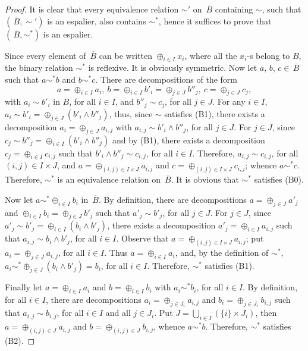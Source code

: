 \documentclass[psamsfonts,reqno]{memo-l}
\theoremstyle{plain}
\theoremstyle{definition}
\theoremstyle{remark}
\numberwithin{equation}{section}
\newcommand{\ol}[1]{\,\overline{\!#1}}
\newcommand{\set}[1]{\{#1\}}
\begin{document}
\begin{proof}
It is clear that every equivalence relation $\sim'$ on $\ol{B}$ containing
$\sim$, such that $(\ol{B},\sim')$ is an espalier, also
contains $\sim^*$, hence it suffices to prove that
$(\ol{B},\sim^*)$ is an espalier.

Since every element of $\ol{B}$ can be written $\oplus_{i\in I}x_i$, where
all the $x_i$-s belong to $B$, the binary relation $\sim^*$ is reflexive. It
is obviously symmetric. Now let $a$, $b$, $c\in\ol{B}$ such that $a\sim^*b$
and $b\sim^*c$. There are decompositions of the form
   \[
   a=\oplus_{i\in I}a_i,\ b=\oplus_{i\in I}b'_i=\oplus_{j\in J}b''_j,\
   c=\oplus_{j\in J}c_j,
   \]
with $a_i\sim b'_i$ in $B$, for all $i\in I$, and $b''_j\sim c_j$, for all
$j\in J$. For any $i\in I$, $a_i\sim b'_i=\oplus_{j\in J}(b'_i\wedge b''_j)$,
thus, since $\sim$ satisfies (B1), there exists a decomposition
$a_i=\oplus_{j\in J}a_{i,j}$ with $a_{i,j}\sim b'_i\wedge b''_j$, for all
$j\in J$. For $j\in J$, since
$c_j\sim b''_j=\oplus_{i\in I}(b'_i\wedge b''_j)$ and by (B1), there exists a
decomposition $c_j=\oplus_{i\in I}c_{i,j}$ such that
$b'_i\wedge b''_j\sim c_{i,j}$, for all $i\in I$. Therefore,
$a_{i,j}\sim c_{i,j}$, for all $(i,j)\in I\times J$, and
$a=\oplus_{(i,j)\in I\times J}a_{i,j}$ and
$c=\oplus_{(i,j)\in I\times J}c_{i,j}$; whence $a\sim^*c$. Therefore, $\sim^*$
is an equivalence relation on $\ol{B}$. It is obvious that $\sim^*$ satisfies
(B0).

Now let $a\sim^*\oplus_{i\in I}b_i$ in $\ol{B}$. By definition, there are
decompositions $a=\oplus_{j\in J}a'_j$ and
$\oplus_{i\in I}b_i=\oplus_{j\in J}b'_j$ such that $a'_j\sim b'_j$, for all
$j\in J$. For $j\in J$, since $a'_j\sim b'_j=\oplus_{i\in I}(b_i\wedge b'_j)$,
there exists a decomposition $a'_j=\oplus_{i\in I}a_{i,j}$ such that
$a_{i,j}\sim b_i\wedge b'_j$, for all $i\in I$. Observe that
$a=\oplus_{(i,j)\in I\times J}a_{i,j}$; put $a_i=\oplus_{j\in J}a_{i,j}$, for
all $i\in I$. Thus $a=\oplus_{i\in I}a_i$, and, by the definition of
$\sim^*$, $a_i\sim^*\oplus_{j\in J}(b_i\wedge b'_j)=b_i$, for all $i\in I$.
Therefore, $\sim^*$ satisfies (B1).

Finally let $a=\oplus_{i\in I}a_i$ and $b=\oplus_{i\in I}b_i$ with
$a_i\sim^*b_i$, for all $i\in I$. By definition, for all $i\in I$, there are
decompositions $a_i=\oplus_{j\in J_i}a_{i,j}$ and
$b_i=\oplus_{j\in J_i}b_{i,j}$ such that $a_{i,j}\sim b_{i,j}$, for all
$i\in I$ and all $j\in J_i$. Put $J=\bigcup_{i\in I}(\set{i}\times J_i)$,
then $a=\oplus_{(i,j)\in J}a_{i,j}$ and $b=\oplus_{(i,j)\in J}b_{i,j}$,
whence $a\sim^*b$. Therefore, $\sim^*$ satisfies (B2).
\end{proof}
\end{document}
